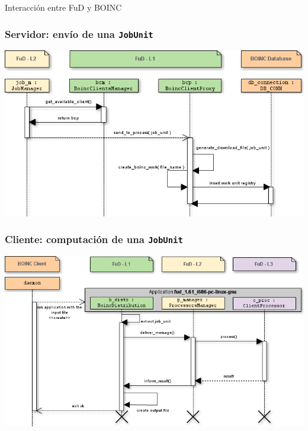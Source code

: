 \begin{subsection}{Interacción entre FuD y BOINC}

	\begin{frame}\frametitle{Servidor: envío de una \texttt{JobUnit}}
		\begin{center}
			\includegraphics[scale=0.45]{images/interaccion-fud-boinc-server_side.png}
		\end{center}
	\end{frame}
	
	\begin{frame}\frametitle{Cliente: computación de una \texttt{JobUnit}}
		\begin{center}
			\includegraphics[scale=0.4]{images/interaccion-fud-boinc-client_side.png}
		\end{center}
	\end{frame}

\end{subsection}

